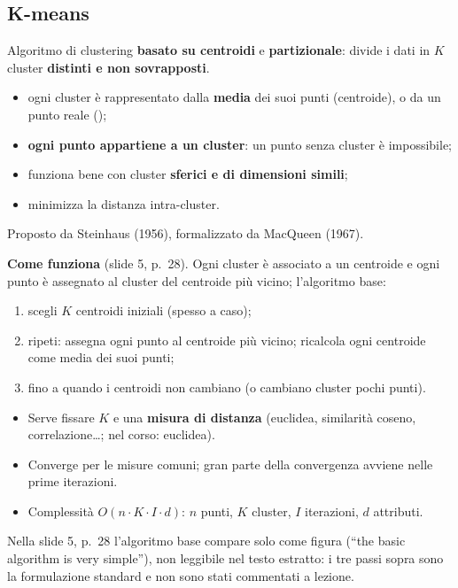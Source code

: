 \subsection{K-means}
\begin{definizione}[k-means]
Algoritmo di clustering \textbf{basato su centroidi} e \textbf{partizionale}: divide i dati in $K$ cluster \textbf{distinti e non
sovrapposti}.
\begin{itemize}
  \item ogni cluster è rappresentato dalla \textbf{media} dei suoi punti (centroide), o da un punto reale ();
  \item \textbf{ogni punto appartiene a un cluster}: un punto senza cluster è impossibile;
  \item funziona bene con cluster \textbf{sferici e di dimensioni simili};
  \item minimizza la distanza intra-cluster.
\end{itemize}
Proposto da Steinhaus (1956), formalizzato da MacQueen (1967).
\end{definizione}

\textbf{Come funziona} (slide 5, p.~28). Ogni cluster è associato a un centroide e ogni punto è assegnato al cluster del centroide più
vicino; l'algoritmo base:
\begin{enumerate}
  \item scegli $K$ centroidi iniziali (spesso a caso);
  \item ripeti: assegna ogni punto al centroide più vicino; ricalcola ogni centroide come media dei suoi punti;
  \item fino a quando i centroidi non cambiano (o cambiano cluster pochi punti).
\end{enumerate}
\begin{itemize}
  \item Serve fissare $K$ e una \textbf{misura di distanza} (euclidea, similarità coseno, correlazione\ldots; nel corso: euclidea).
  \item Converge per le misure comuni; gran parte della convergenza avviene nelle prime iterazioni.
  \item Complessità $O(n \cdot K \cdot I \cdot d)$: $n$ punti, $K$ cluster, $I$ iterazioni, $d$ attributi.
\end{itemize}
\begin{verifica}
Nella slide 5, p.~28 l'algoritmo base compare solo come figura (``the basic algorithm is very simple''), non leggibile nel testo estratto:
i tre passi sopra sono la formulazione standard e non sono stati commentati a lezione.
\end{verifica}

